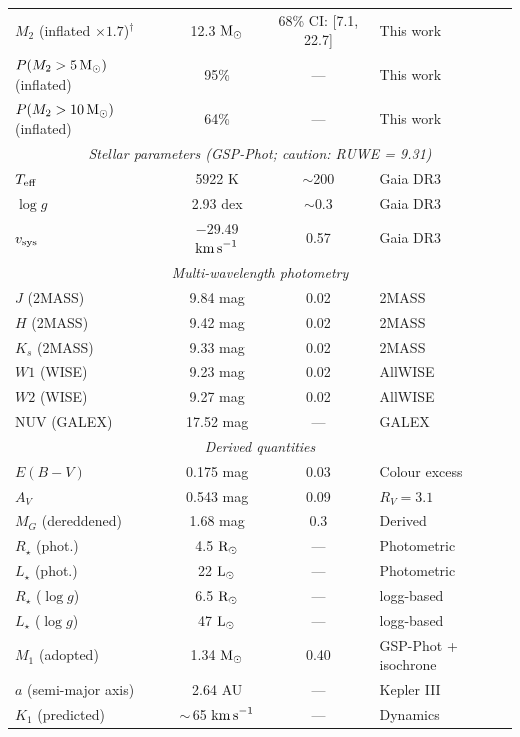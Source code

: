 \documentclass[usenatbib,fleqn]{mnras}
\newcommand{\Msun}{{\rm M}_\odot}
\newcommand{\Lsun}{{\rm L}_\odot}
\newcommand{\Rsun}{{\rm R}_\odot}
\newcommand{\kms}{{\rm km\,s}^{-1}}
\begin{document}
\begin{table}
\begin{tabular}{lccl}
$M_2$ (inflated $\times 1.7$)$^\dagger$ & 12.3 $\Msun$ & 68\% CI: [7.1, 22.7] & This work \\
$P(M_2 > 5\,\Msun)$ (inflated) & 95\%    & ---      & This work \\
$P(M_2 > 10\,\Msun)$ (inflated) & 64\%   & ---      & This work \\
\midrule
\multicolumn{4}{c}{\textit{Stellar parameters (GSP-Phot; caution: RUWE = 9.31)}} \\
$T_{\rm eff}$          & 5922 K              & $\sim$200 & Gaia DR3 \\
$\log g$               & 2.93 dex            & $\sim$0.3 & Gaia DR3 \\
$v_{\rm sys}$          & $-29.49$ $\kms$     & 0.57     & Gaia DR3 \\
\midrule
\multicolumn{4}{c}{\textit{Multi-wavelength photometry}} \\
$J$ (2MASS)            & 9.84 mag            & 0.02     & 2MASS \\
$H$ (2MASS)            & 9.42 mag            & 0.02     & 2MASS \\
$K_s$ (2MASS)          & 9.33 mag            & 0.02     & 2MASS \\
$W1$ (WISE)            & 9.23 mag            & 0.02     & AllWISE \\
$W2$ (WISE)            & 9.27 mag            & 0.02     & AllWISE \\
NUV (GALEX)            & 17.52 mag           & ---      & GALEX \\
\midrule
\multicolumn{4}{c}{\textit{Derived quantities}} \\
$E(B-V)$               & 0.175 mag           & 0.03     & Colour excess \\
$A_V$                  & 0.543 mag           & 0.09     & $R_V = 3.1$ \\
$M_G$ (dereddened)     & 1.68 mag            & 0.3      & Derived \\
$R_\star$ (phot.)      & 4.5 $\Rsun$         & ---      & Photometric \\
$L_\star$ (phot.)      & 22 $\Lsun$          & ---      & Photometric \\
$R_\star$ ($\log g$)   & 6.5 $\Rsun$         & ---      & logg-based \\
$L_\star$ ($\log g$)   & 47 $\Lsun$          & ---      & logg-based \\
$M_1$ (adopted)        & 1.34 $\Msun$        & 0.40     & GSP-Phot + isochrone \\
$a$ (semi-major axis)  & 2.64 AU             & ---      & Kepler III \\
$K_1$ (predicted)      & $\sim$\,65 $\kms$   & ---      & Dynamics \\
\bottomrule
\end{tabular}
\end{table}
\end{document}
